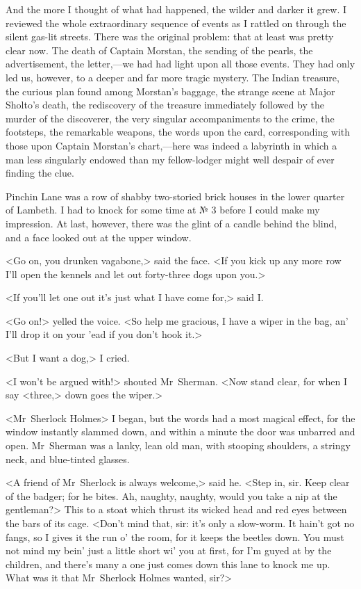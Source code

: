 And the more I thought of what had happened, the wilder and darker it grew. I reviewed the whole extraordinary sequence of events as I rattled on through the silent gas-lit streets. There was the original problem: that at least was pretty clear now. The death of Captain Morstan, the sending of the pearls, the advertisement, the letter,—we had had light upon all those events. They had only led us, however, to a deeper and far more tragic mystery. The Indian treasure, the curious plan found among Morstan's baggage, the strange scene at Major Sholto's death, the rediscovery of the treasure immediately followed by the murder of the discoverer, the very singular accompaniments to the crime, the footsteps, the remarkable weapons, the words upon the card, corresponding with those upon Captain Morstan's chart,—here was indeed a labyrinth in which a man less singularly endowed than my fellow-lodger might well despair of ever finding the clue.

Pinchin Lane was a row of shabby two-storied brick houses in the lower quarter of Lambeth. I had to knock for some time at № 3 before I could make my impression. At last, however, there was the glint of a candle behind the blind, and a face looked out at the upper window.

<Go on, you drunken vagabone,> said the face. <If you kick up any more row I'll open the kennels and let out forty-three dogs upon you.>

<If you'll let one out it's just what I have come for,> said I\@.

<Go on!> yelled the voice. <So help me gracious, I have a wiper in the bag, an' I'll drop it on your 'ead if you don't hook it.>

<But I want a dog,> I cried.

<I won't be argued with!> shouted Mr~Sherman. <Now stand clear, for when I say <three,> down goes the wiper.>

<Mr~Sherlock Holmes\longdash> I began, but the words had a most magical effect, for the window instantly slammed down, and within a minute the door was unbarred and open. Mr~Sherman was a lanky, lean old man, with stooping shoulders, a stringy neck, and blue-tinted glasses.

<A friend of Mr~Sherlock is always welcome,> said he. <Step in, sir. Keep clear of the badger; for he bites. Ah, naughty, naughty, would you take a nip at the gentleman?> This to a stoat which thrust its wicked head and red eyes between the bars of its cage. <Don't mind that, sir: it's only a slow-worm. It hain't got no fangs, so I gives it the run o' the room, for it keeps the beetles down. You must not mind my bein' just a little short wi' you at first, for I'm guyed at by the children, and there's many a one just comes down this lane to knock me up. What was it that Mr~Sherlock Holmes wanted, sir?>

